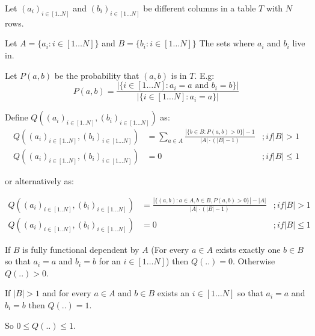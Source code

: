 \documentclass[a5paper, landscape]{article}
\begin{document}
Let $(a_i)_{i \in [1..N]}$ and $(b_i)_{i \in [1 \ldots N]}$ be different columns in a table $T$ with $N$ rows.

Let $A = \{ a_i : i \in [1 \ldots N] \}$ and $B = \{ b_i : i \in [1 \ldots N] \}$ The sets where $a_i$ and $b_i$ live in.

Let $P(a,b)$ be the probability that $(a,b)$ is in $T$. E.g:
\[
  P(a,b) = \frac{| \{ i \in [1 \ldots N] : a_i = a \mbox{ and } b_i = b\} |}{| \{ i \in [1 \ldots N] : a_i = a \} |}
\]

Define $Q((a_i)_{i \in [1..N]}, (b_i)_{i \in [1 \ldots N]})$ as:
\[
\begin{array}{lll}
 Q((a_i)_{i \in [1..N]}, (b_i)_{i \in [1 \ldots N]}) &
 = \sum_{a \in A} \frac{|\{ b \in B : P(a,b) > 0 \}| - 1}{|A| \cdot (|B| - 1)}
& ; if |B| > 1 \\
 Q((a_i)_{i \in [1..N]}, (b_i)_{i \in [1 \ldots N]}) &  = 0 & ; if |B| \leq 1 
\end{array}
\]

or alternatively as:

\[
\begin{array}{lll}
 Q((a_i)_{i \in [1..N]}, (b_i)_{i \in [1 \ldots N]}) &
 = \frac{|\{ (a,b) : a \in A, b \in B , P(a,b) > 0 \}| - |A|}{|A| \cdot (|B| - 1)}
& ; if |B| > 1 \\
 Q((a_i)_{i \in [1..N]}, (b_i)_{i \in [1 \ldots N]}) &  = 0 & ; if |B| \leq 1 
\end{array}
\]

If $B$ is fully functional dependent by $A$ (For every $a \in A$ exists exactly one $b \in B$ so that $a_i = a$ and $b_i = b$ for an $i \in [1\ldots N]$) then $Q(..) = 0$.
Otherwise $Q(..) > 0$.

If $|B| > 1$ and for every $a \in A$ and $b \in B$ exists an $i \in [1 \ldots N]$ so that $a_i = a$ and $b_i = b$ then $Q(..) = 1$.

So $0 \leq Q(..) \leq 1$.
\end{document}
